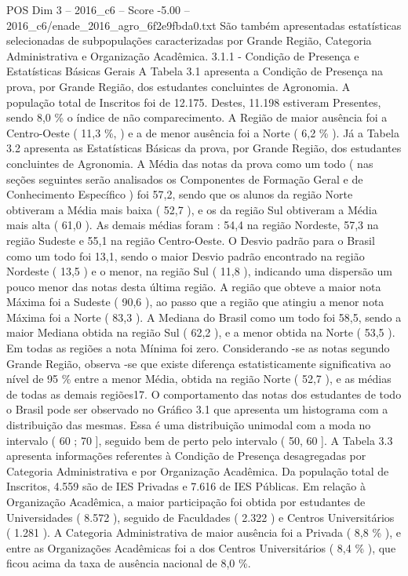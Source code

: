 \begin{textsample}{POS Dim 3 – 2016\_c6 – Score -5.00 – 2016\_c6/enade\_2016\_agro\_6f2e9fbda0.txt}
São também apresentadas estatísticas selecionadas de subpopulações caracterizadas por Grande Região, Categoria Administrativa e Organização Acadêmica. 3.1.1 - Condição de Presença e Estatísticas Básicas Gerais A Tabela 3.1 apresenta a Condição de Presença na prova, por Grande Região, dos estudantes concluintes de Agronomia.
A população total de Inscritos foi de 12.175.
Destes, 11.198 estiveram Presentes, sendo 8,0 \% o índice de não comparecimento.
A Região de maior ausência foi a Centro-Oeste ( 11,3 \%, ) e a de menor ausência foi a Norte ( 6,2 \% ).
Já a Tabela 3.2 apresenta as Estatísticas Básicas da prova, por Grande Região, dos estudantes concluintes de Agronomia.
A Média das notas da prova como um todo ( nas seções seguintes serão analisados os Componentes de Formação Geral e de Conhecimento Específico ) foi 57,2, sendo que os alunos da região Norte obtiveram a Média mais baixa ( 52,7 ), e os da região Sul obtiveram a Média mais alta ( 61,0 ).
As demais médias foram : 54,4 na região Nordeste, 57,3 na região Sudeste e 55,1 na região Centro-Oeste.
O Desvio padrão para o Brasil como um todo foi 13,1, sendo o maior Desvio padrão encontrado na região Nordeste ( 13,5 ) e o menor, na região Sul ( 11,8 ), indicando uma dispersão um pouco menor das notas desta última região.
A região que obteve a maior nota Máxima foi a Sudeste ( 90,6 ), ao passo que a região que atingiu a menor nota Máxima foi a Norte ( 83,3 ).
A Mediana do Brasil como um todo foi 58,5, sendo a maior Mediana obtida na região Sul ( 62,2 ), e a menor obtida na Norte ( 53,5 ).
Em todas as regiões a nota Mínima foi zero.
Considerando -se as notas segundo Grande Região, observa -se que existe diferença estatisticamente significativa ao nível de 95 \% entre a menor Média, obtida na região Norte ( 52,7 ), e as médias de todas as demais regiões17.
O comportamento das notas dos estudantes de todo o Brasil pode ser observado no Gráfico 3.1 que apresenta um histograma com a distribuição das mesmas.
Essa é uma distribuição unimodal com a moda no intervalo ( 60 ; 70 ], seguido bem de perto pelo intervalo ( 50, 60 ].
A Tabela 3.3 apresenta informações referentes à Condição de Presença desagregadas por Categoria Administrativa e por Organização Acadêmica.
Da população total de Inscritos, 4.559 são de IES Privadas e 7.616 de IES Públicas.
Em relação à Organização Acadêmica, a maior participação foi obtida por estudantes de Universidades ( 8.572 ), seguido de Faculdades ( 2.322 ) e Centros Universitários ( 1.281 ).
A Categoria Administrativa de maior ausência foi a Privada ( 8,8 \% ), e entre as Organizações Acadêmicas foi a dos Centros Universitários ( 8,4 \% ), que ficou acima da taxa de ausência nacional de 8,0 \%.

\end{textsample}
